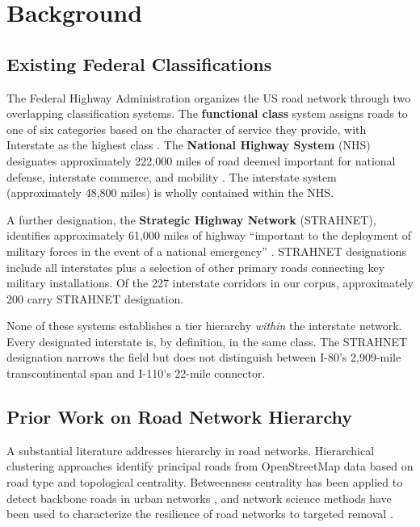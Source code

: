 \section{Background}

\subsection{Existing Federal Classifications}

The Federal Highway Administration organizes the US road network through two overlapping classification systems. The \textbf{functional class} system assigns roads to one of six categories based on the character of service they provide, with Interstate as the highest class \citep{FHWA_FC2013}. The \textbf{National Highway System} (NHS) designates approximately 222,000 miles of road deemed important for national defense, interstate commerce, and mobility \citep{FHWA_NHS2023}. The interstate system (approximately 48,800 miles) is wholly contained within the NHS.

A further designation, the \textbf{Strategic Highway Network} (STRAHNET), identifies approximately 61,000 miles of highway ``important to the deployment of military forces in the event of a national emergency'' \citep{DOD_STRAHNET}. STRAHNET designations include all interstates plus a selection of other primary roads connecting key military installations. Of the 227 interstate corridors in our corpus, approximately 200 carry STRAHNET designation.

None of these systems establishes a tier hierarchy \textit{within} the interstate network. Every designated interstate is, by definition, in the same class. The STRAHNET designation narrows the field but does not distinguish between I-80's 2,909-mile transcontinental span and I-110's 22-mile connector.

\subsection{Prior Work on Road Network Hierarchy}

A substantial literature addresses hierarchy in road networks. Hierarchical clustering approaches \citep{Jiang2007} identify principal roads from OpenStreetMap data based on road type and topological centrality. Betweenness centrality has been applied to detect backbone roads in urban networks \citep{Crucitti2006, Porta2006}, and network science methods have been used to characterize the resilience of road networks to targeted removal \citep{Sullivan2010}.

